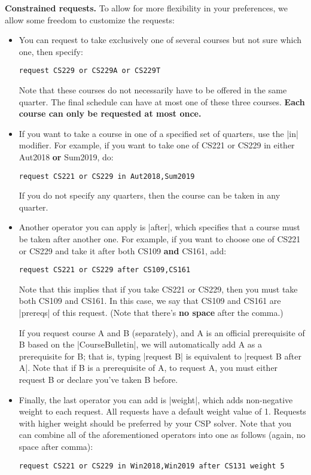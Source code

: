 {\bf Constrained requests.}
To allow for more flexibility in your preferences, we allow some freedom to
customize the requests:
\begin{itemize}
  \item You can request to take exclusively one of several courses but not sure
  which one, then specify:
\begin{lstlisting}
request CS229 or CS229A or CS229T
\end{lstlisting}


  Note that these courses do not necessarily have to be offered in the same
  quarter. The final schedule can have at most one of these three courses.
  {\bf Each course can only be requested at most once.}

  \item If you want to take a course in one of a specified set of quarters, use
  the |in| modifier. For example, if you want to take one of CS221 or CS229 in
  either Aut2018 {\bf or} Sum2019, do:
\begin{lstlisting}
request CS221 or CS229 in Aut2018,Sum2019
\end{lstlisting}

  If you do not specify any quarters, then the course can be taken in any quarter.

  \item Another operator you can apply is |after|, which specifies that a course
  must be taken after another one. For example, if you want to choose one of
  CS221 or CS229 and take it after both CS109 {\bf and} CS161, add:
\begin{lstlisting}
request CS221 or CS229 after CS109,CS161
\end{lstlisting}

  Note that this implies that if you take CS221 or CS229, then you must take
  both CS109 and CS161. In this case, we say that CS109 and CS161 are |prereqs|
  of this request. (Note that there's {\bf no space} after the comma.)

  If you request course A and B (separately), and A is an official prerequisite
  of B based on the |CourseBulletin|, we will automatically add A as a
  prerequisite for B; that is, typing |request B| is equivalent to
  |request B after A|. Note that if B is a prerequisite of A, to request A, you
  must either request B or declare you've taken B before.

  \item Finally, the last operator you can add is |weight|, which adds
  non-negative weight to each request. All requests have a default weight
  value of 1. Requests with higher weight should be preferred by your CSP
  solver. Note that you can combine all of the aforementioned operators into one
  as follows (again, no space after comma):
\begin{lstlisting}
request CS221 or CS229 in Win2018,Win2019 after CS131 weight 5
\end{lstlisting}
\end{itemize}


